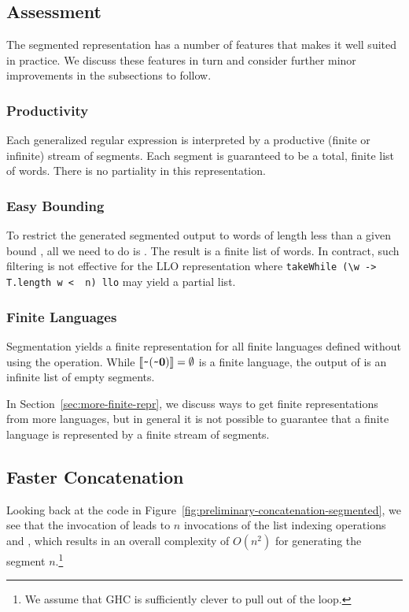 \subsection{Assessment}
\label{sec:interm-assessm}

The segmented representation has a number of features that makes it
well suited in practice. We discuss these features in turn and
consider further minor improvements in the subsections to follow.

\subsubsection{Productivity}
Each generalized regular expression is interpreted by a productive
(finite or infinite) stream of segments. Each segment is guaranteed to
be a total, finite list of words. There is no partiality in this representation.

\subsubsection{Easy Bounding}
To restrict the generated segmented output  to words of length less than a given
bound , all we need to do is . The result is
a finite list of words. In contract, such filtering is not effective
for the LLO representation where
\lstinline{takeWhile (\w -> T.length w <  n) llo} may yield a partial list.

\subsubsection{Finite Languages}
Segmentation yields a finite representation for all finite languages
defined without using the  operation. While
$\llbracket\texttt{\textasciitilde}{(\texttt{\textasciitilde}{\mathbf0})}\rrbracket = \emptyset$ is a finite 
language, the output of  is an
infinite list of empty segments.

In Section~\ref{sec:more-finite-repr}, we discuss ways to get finite
representations from more languages, but in general it is
not possible to guarantee that a finite language is represented by a
finite stream of segments.

\subsection{Faster Concatenation}
\label{sec:faster-concatenation}

Looking back at the code in
Figure~\ref{fig:preliminary-concatenation-segmented}, we see that the
invocation of  leads to $n$ invocations of the list
indexing operations  and , which
results in an  overall complexity of $O (n^2)$ for generating the
segment $n$.\footnote{We assume that
GHC is sufficiently clever to pull  out of the loop.}

